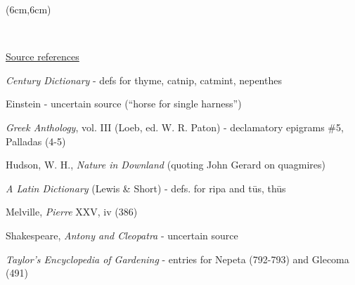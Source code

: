 \documentclass[a4paper,12pt]{article}
\begin{document}
\begin{textblock*}{5cm}(6cm,6cm)%
\scriptsize
{}%
\end{textblock*}

\leavevmode
\\[0.5in]
\setlength{\parskip}{15pt}
\color{black}
\noindent\makebox[\linewidth]{\rule{\paperwidth}{0.4pt}}
\large
{\selectfont
{}
\begin{center}
\center\ul{Source references}
\end{center}
\normalsize
\begin{hangparas}{2em}{1}
	\textit{Century Dictionary} - defs for thyme, catnip, catmint, nepenthes\par
	Einstein - uncertain source (``horse for single harness'')\par
	\textit{Greek Anthology}, vol. III (Loeb, ed. W. R. Paton) - declamatory epigrams \#5, Palladas (4-5)\par
	Hudson, W. H., \textit{Nature in Downland} (quoting John Gerard on quagmires)\par
	\textit{A Latin Dictionary} (Lewis \& Short) - defs. for ripa and tūs, thūs\par
	Melville, \textit{Pierre} XXV, iv (386)\par
	Shakespeare, \textit{Antony and Cleopatra} - uncertain source\par
	\textit{Taylor's Encyclopedia of Gardening} - entries for Nepeta (792-793) and Glecoma (491)\par
\end{hangparas}
}
\end{document}
